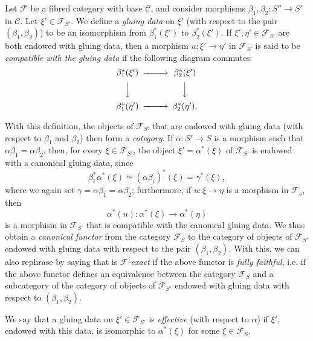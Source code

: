 \begin{definition}\label{fga3.i-a.1-definition-1.4}
    Let $\mathcal{F}$ be a fibred category with base $\mathcal{C}$, and consider morphisms $\beta_1,\beta_2\colon S''\to S'$ in $\mathcal{C}$.
    Let $\xi'\in\mathcal{F}_{S'}$.
    We define a \emph{gluing data} on $\xi'$ (with respect to the pair $(\beta_1,\beta_2)$) to be an isomorphism from $\beta_1^*(\xi')$ to $\beta_2^*(\xi')$.
    If $\xi',\eta'\in\mathcal{F}_{S'}$ are both endowed with gluing data, then a morphism $u\colon\xi'\to\eta'$ in $\mathcal{F}_{S'}$ is said to be \emph{compatible with the gluing data} if the following diagram commutes:
    \[
        \begin{CD}
            \beta_1^*(\xi') @>>> \beta_2^*(\xi')
            \\@VVV @VVV
            \\\beta_1^*(\eta') @>>> \beta_2^*(\eta').
        \end{CD}
    \]
\end{definition}


With this definition, the objects of $\mathcal{F}_{S'}$ that are endowed with gluing data (with respect to $\beta_1$ and $\beta_2$) then form a \emph{category}.
If $\alpha\colon S'\to S$ is a morphism such that $\alpha\beta_1=\alpha\beta_2$, then, for every $\xi\in\mathcal{F}_{S'}$, the object $\xi'=\alpha^*(\xi)$ of $\mathcal{F}_{S'}$ is endowed with a canonical gluing data, since
\[
    \beta_i^*\alpha^*(\xi)
    \simeq (\alpha\beta_i)^*(\xi)
    = \gamma^*(\xi),
\]
where we again set $\gamma=\alpha\beta_1=\alpha\beta_2$;
furthermore, if $u\colon\xi\to\eta$ is a morphism in $\mathcal{F}_s$, then
\[
    \alpha^*(u)\colon \alpha^*(\xi) \to \alpha^*(\eta)
\]
is a morphism in $\mathcal{F}_{S'}$ that is compatible with the canonical gluing data.
We thus obtain a \emph{canonical functor} from the category $\mathcal{F}_S$ to the category of objects of $\mathcal{F}_{S'}$ endowed with gluing data with respect to the pair $(\beta_1,\beta_2)$.
With this, we can also rephrase  by saying that  is \emph{$\mathcal{F}$-exact} if the above functor is \emph{fully faithful}, i.e. if the above functor defines an equivalence between the category $\mathcal{F}_S$ and a subcategory of the category of objects of $\mathcal{F}_{S'}$ endowed with gluing data with respect to $(\beta_1,\beta_2)$.


\begin{definition}\label{fga3.i-a.1-definition-1.5}
    We say that a gluing data on $\xi'\in\mathcal{F}_{S'}$ is \emph{effective} (with respect to $\alpha$) if $\xi'$, endowed with this data, is isomorphic to $\alpha^*(\xi)$ for some $\xi\in\mathcal{F}_S$.
\end{definition}


